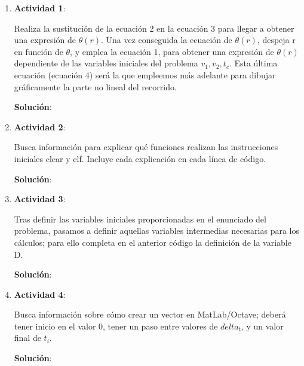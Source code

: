 \documentclass[11pt,letterpaper]{article}
\begin{document}
\begin{enumerate}

	\item \textbf{Actividad 1}:
	
	Realiza la sustitución de la ecuación 2 en la ecuación 3 para llegar a obtener una expresión de $\theta(r)$. Una vez conseguida la ecuación de $\theta(r)$, 
	despeja r en función de $\theta$, y emplea la ecuación 1, para obtener una expresión de $\theta(r)$ dependiente de las variables iniciales del problema 
	$v_{1}, v_{2}, t_{c}$. Esta última ecuación (ecuación 4) será la que empleemos más adelante para dibujar gráficamente la parte no lineal del recorrido.

	\textbf{Solución}: 


	\item \textbf{Actividad 2}:
	
	Busca información para explicar qué funciones realizan las instrucciones iniciales clear y clf. Incluye cada explicación en cada línea de código.

	\textbf{Solución}: 

	\item \textbf{Actividad 3}:
	
	Tras definir las variables iniciales proporcionadas en el enunciado del problema, pasamos a definir aquellas variables intermedias necesarias para los cálculos; 
	para ello completa en el anterior código la definición de la variable D.

	\textbf{Solución}: 
	
		\item \textbf{Actividad 4}:
	
	Busca información sobre cómo crear un vector en MatLab/Octave; deberá tener inicio en el valor 0, tener un paso entre valores de $delta_t$, y un valor final de $t_{i}$.

	\textbf{Solución}: 

\end{enumerate}
\end{document}
